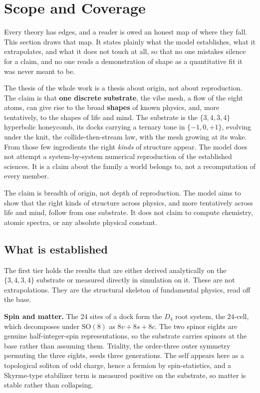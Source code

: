 \section{Scope and Coverage}

Every theory has edges, and a reader is owed an honest map of where they fall. This section draws that map. It states plainly what the model establishes, what it extrapolates, and what it does not touch at all, so that no one mistakes silence for a claim, and no one reads a demonstration of shape as a quantitative fit it was never meant to be.

The thesis of the whole work is a thesis about origin, not about reproduction. The claim is that \textbf{one discrete substrate}, the vibe mesh, a flow of the eight atoms, can give rise to the broad \textbf{shapes} of known physics, and, more tentatively, to the shapes of life and mind. The substrate is the $\{3,4,3,4\}$ hyperbolic honeycomb, its docks carrying a ternary tone in $\{-1,0,+1\}$, evolving under the knit, the collide-then-stream law, with the mesh growing at its wake. From those few ingredients the right \emph{kinds} of structure appear. The model does not attempt a system-by-system numerical reproduction of the established sciences. It is a claim about the family a world belongs to, not a recomputation of every member.

\begin{principle}
The claim is breadth of origin, not depth of reproduction. The model aims to show that the right kinds of structure across physics, and more tentatively across life and mind, follow from one substrate. It does not claim to compute chemistry, atomic spectra, or any absolute physical constant.
\end{principle}

\subsection{What is established}

The first tier holds the results that are either derived analytically on the $\{3,4,3,4\}$ substrate or measured directly in simulation on it. These are not extrapolations. They are the structural skeleton of fundamental physics, read off the base.

\textbf{Spin and matter.} The $24$ sites of a dock form the $D_4$ root system, the $24$-cell, which decomposes under $\mathrm{SO}(8)$ as $8v + 8s + 8c$. The two spinor eights are genuine half-integer-spin representations, so the substrate carries spinors at the base rather than assuming them. Triality, the order-three outer symmetry permuting the three eights, seeds three generations. The self appears here as a topological soliton of odd charge, hence a fermion by spin-statistics, and a Skyrme-type stabilizer term is measured positive on the substrate, so matter is stable rather than collapsing.


